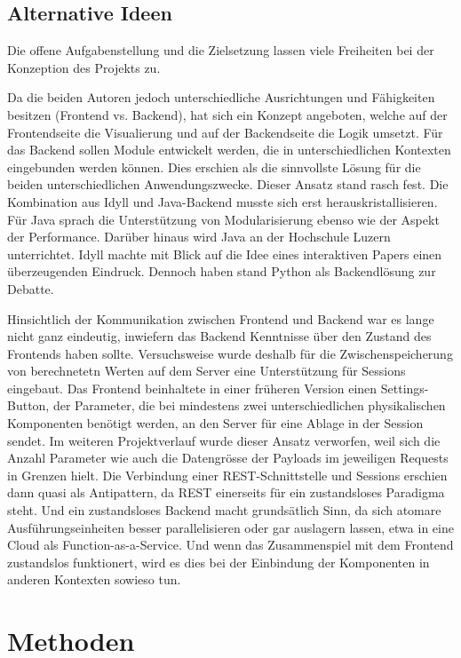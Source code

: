 \documentclass[a4paper,10.2pt,pdftex]{scrartcl}%
\begin{document}
\subsection{Alternative Ideen}
Die offene Aufgabenstellung und die Zielsetzung lassen viele Freiheiten bei der Konzeption des Projekts zu.

Da die beiden Autoren jedoch unterschiedliche Ausrichtungen und Fähigkeiten besitzen (Frontend vs. Backend), hat sich ein Konzept angeboten, welche auf der Frontendseite die Visualierung und auf der Backendseite die Logik umsetzt. Für das Backend sollen Module entwickelt werden, die in unterschiedlichen Kontexten eingebunden werden können. Dies erschien als die sinnvollste Lösung für die beiden unterschiedlichen Anwendungszwecke.  Dieser Ansatz stand rasch fest. Die Kombination aus Idyll und Java-Backend musste sich erst herauskristallisieren. Für Java sprach die Unterstützung von Modularisierung ebenso wie der Aspekt der Performance. Darüber hinaus wird Java an der Hochschule Luzern unterrichtet. Idyll machte mit Blick auf die Idee eines interaktiven Papers einen überzeugenden Eindruck. Dennoch haben stand Python als Backendlösung zur Debatte. 

Hinsichtlich der Kommunikation zwischen Frontend und Backend war es lange nicht ganz eindeutig, inwiefern das Backend Kenntnisse über den Zustand des Frontends haben sollte. Versuchsweise wurde deshalb für die Zwischenspeicherung von berechnetetn Werten auf dem Server eine Unterstützung für Sessions eingebaut. Das Frontend beinhaltete in einer früheren Version einen Settings-Button, der Parameter, die bei mindestens zwei unterschiedlichen physikalischen Komponenten benötigt werden, an den Server für eine Ablage in der Session sendet. Im weiteren Projektverlauf wurde dieser Ansatz verworfen, weil sich die Anzahl Parameter wie auch die Datengrösse der Payloads im jeweiligen Requests in Grenzen hielt. Die Verbindung einer REST-Schnittstelle und Sessions erschien dann quasi als Antipattern, da REST einerseits für ein zustandsloses Paradigma steht. Und ein zustandsloses Backend macht grundsätlich Sinn, da sich atomare Ausführungseinheiten besser parallelisieren oder gar auslagern lassen, etwa in eine Cloud als Function-as-a-Service. Und wenn das Zusammenspiel mit dem Frontend zustandslos funktionert, wird es dies bei der Einbindung der Komponenten in anderen Kontexten sowieso tun. 

\section{Methoden}
\end{document}

